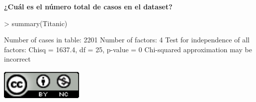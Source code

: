 \documentclass[12pt]{report}
\begin{document}
\textbf{¿Cuál es el número total de casos en el dataset?}

\begin{Schunk}
\begin{Sinput}
> summary(Titanic)
\end{Sinput}
\begin{Soutput}
Number of cases in table: 2201 
Number of factors: 4 
Test for independence of all factors:
	Chisq = 1637.4, df = 25, p-value = 0
	Chi-squared approximation may be incorrect
\end{Soutput}
\end{Schunk}

\begin{center}
\href{http://creativecommons.org/licenses/by-nc/4.0/}{\includegraphics[width=4cm, height=1.5cm]{cc.png}}
\end{center}
\end{document}
